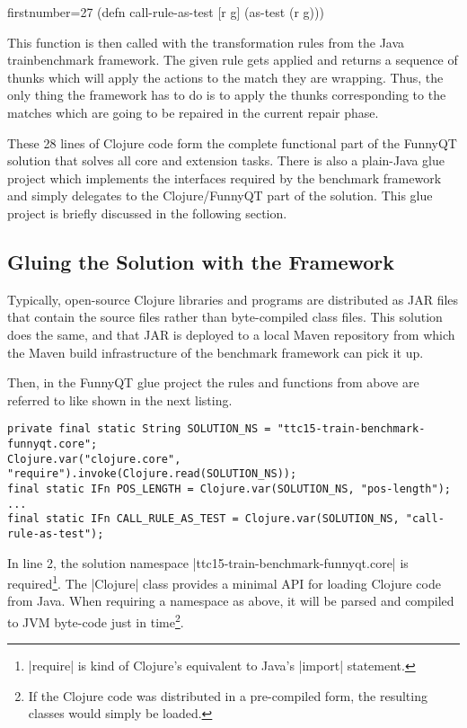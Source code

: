 \documentclass[submission]{eptcs}
\newcommand{\code}{\clojureinline}
\begin{document}
\begin{clojurecode*}{firstnumber=27}
(defn call-rule-as-test [r g]
  (as-test (r g)))
\end{clojurecode*}

This function is then called with the transformation rules from the Java
trainbenchmark framework.  The given rule gets applied and returns a sequence
of thunks which will apply the actions to the match they are wrapping.  Thus,
the only thing the framework has to do is to apply the thunks corresponding to
the matches which are going to be repaired in the current repair phase.

These 28 lines of Clojure code form the complete functional part of the FunnyQT
solution that solves all core and extension tasks.  There is also a plain-Java
glue project which implements the interfaces required by the benchmark
framework and simply delegates to the Clojure/FunnyQT part of the solution.
This glue project is briefly discussed in the following section.


\subsection{Gluing the Solution with the Framework}
\label{sec:gluing}

Typically, open-source Clojure libraries and programs are distributed as JAR
files that contain the source files rather than byte-compiled class files.
This solution does the same, and that JAR is deployed to a local Maven
repository from which the Maven build infrastructure of the benchmark framework
can pick it up.

Then, in the FunnyQT glue project the rules and functions from above are
referred to like shown in the next listing.

\begin{verbatim}
private final static String SOLUTION_NS = "ttc15-train-benchmark-funnyqt.core";
Clojure.var("clojure.core", "require").invoke(Clojure.read(SOLUTION_NS));
final static IFn POS_LENGTH = Clojure.var(SOLUTION_NS, "pos-length");
...
final static IFn CALL_RULE_AS_TEST = Clojure.var(SOLUTION_NS, "call-rule-as-test");
\end{verbatim}

In line 2, the solution namespace \code|ttc15-train-benchmark-funnyqt.core| is
required\footnote{\code|require| is kind of Clojure's equivalent to Java's
  \code|import| statement.}.  The \code|Clojure| class provides a minimal API
for loading Clojure code from Java.  When requiring a namespace as above, it
will be parsed and compiled to JVM byte-code just in time\footnote{If the
  Clojure code was distributed in a pre-compiled form, the resulting classes
  would simply be loaded.}.
\end{document}
